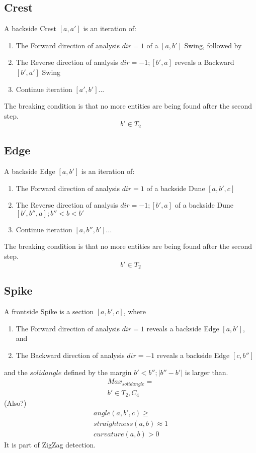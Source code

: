 \documentclass{report}
\begin{document}
\subsection{Crest}
A backside Crest $[a,a']$ is an iteration of:
\begin{enumerate}
\item The Forward direction of analysis $dir=1$ of a $[a,b']$ Swing, followed by 
\item The Reverse direction of analysis $dir=-1;[b',a]$ reveals a Backward $[b',a']$ Swing
\item Continue iteration $[a',b']...$
\end{enumerate}
The breaking condition is that no more entities are being found after the second step.
\begin{equation}
b' \in T_{2}
\end{equation}

\subsection{Edge}
A backside Edge $[a,b']$ is an iteration of:
\begin{enumerate}
\item The Forward direction of analysis $dir=1$ of a backside Dune $[a,b',c]$
\item The Reverse direction of analysis $dir=-1;[b',a]$ of a backside Dune $[b',b'',a]; b''<b<b'$ 
\item Continue iteration $[a,b'',b']...$
\end{enumerate}
The breaking condition is that no more entities are being found after the second step.
\begin{equation}
b' \in T_{2}
\end{equation}

\subsection{Spike}
A frontside Spike is a section $[a,b',c]$, where
\begin{enumerate}
\item The Forward direction of analysis $dir=1$ reveals a backside Edge $[a,b']$, and
\item The Backward direction of analysis $dir=-1$ reveals a backside Edge $[c,b'']$ 
\end{enumerate}
and the $solidangle$ defined by the margin $b'<b''; \lvert b''-b' \rvert$ is larger than.\\
\begin{align}
Max_{solidangle}=\\
b' \in T_{2},C_{4}
\end{align}
(Also?)
\begin{align}
angle(a,b',c)\geq\\
straightness(a,b)\approx 1\\
curvature(a,b)>0
\end{align}
It is part of ZigZag detection.
\end{document}
